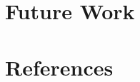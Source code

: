 \documentclass[12pt]{article}\usepackage[]{graphicx}\usepackage[]{color}
\begin{document}
\section{Future Work}

\section{References}
 
	
\end{document}
